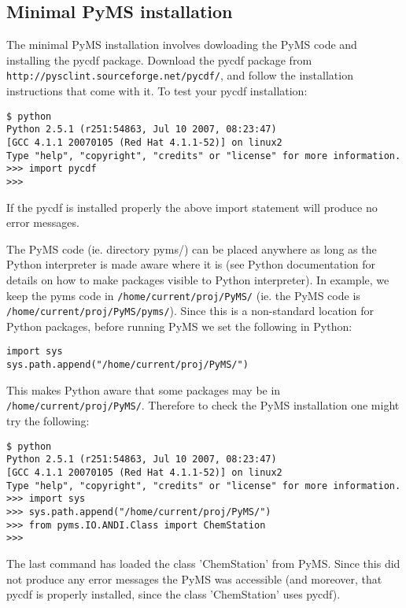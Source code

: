 \subsection{Minimal PyMS installation}

The minimal PyMS installation involves dowloading the PyMS code and
installing the pycdf package. Download the pycdf package from
{\tt http://pysclint.sourceforge.net/pycdf/}, and follow the
installation instructions that come with it. To test your pycdf
installation:

\begin{verbatim}
$ python
Python 2.5.1 (r251:54863, Jul 10 2007, 08:23:47)
[GCC 4.1.1 20070105 (Red Hat 4.1.1-52)] on linux2
Type "help", "copyright", "credits" or "license" for more information.
>>> import pycdf
>>>
\end{verbatim}

If the pycdf is installed properly the above import statement will produce
no error messages.

The PyMS code (ie. directory pyms/) can be placed anywhere as long as the
Python interpreter is made aware where it is (see Python documentation
for details on how to make packages visible to Python interpreter). In
example, we keep the pyms code in {\tt /home/current/proj/PyMS/} (ie. the
PyMS code is {\tt /home/current/proj/PyMS/pyms/}). Since this is a
non-standard location for Python packages, before running PyMS we set the
following in Python:

\begin{verbatim}
import sys
sys.path.append("/home/current/proj/PyMS/")
\end{verbatim}

This makes Python aware that some packages may be in {\tt
/home/current/proj/PyMS/}. Therefore to check the PyMS installation one
might try the following:

\begin{verbatim}
$ python
Python 2.5.1 (r251:54863, Jul 10 2007, 08:23:47)
[GCC 4.1.1 20070105 (Red Hat 4.1.1-52)] on linux2
Type "help", "copyright", "credits" or "license" for more information.
>>> import sys
>>> sys.path.append("/home/current/proj/PyMS/")
>>> from pyms.IO.ANDI.Class import ChemStation
>>>
\end{verbatim}

The last command has loaded the class 'ChemStation' from PyMS. Since this
did not produce any error messages the PyMS was accessible (and moreover,
that pycdf is properly installed, since the class 'ChemStation' uses pycdf).

